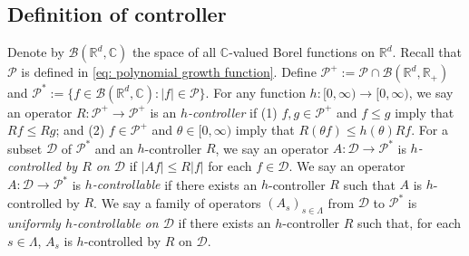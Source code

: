 \documentclass[12pt,a4paper]{amsart}
\theoremstyle{plain}
\theoremstyle{definition}
\numberwithin{equation}{section}
\begin{document}
\subsection{Definition of controller}
\label{sec: controller}
	Denote by $\mathcal B(\mathbb R^d, \mathbb C)$ the space of all $\mathbb C$-valued Borel functions on $\mathbb R^d$.
	Recall that $\mathcal P$ is defined in \eqref{eq: polynomial growth function}.
    Define $\mathcal P^+:= \mathcal P \cap \mathcal B(\mathbb R^d, \mathbb R_+)$ and $\mathcal P^*:= \{f\in \mathcal B(\mathbb R^d, \mathbb C): |f|\in \mathcal P\}$.
    For any function $h: [0,\infty) \to [0,\infty)$, we say an operator $R: \mathcal P^+ \to \mathcal P^+$ is an \emph{$h$-controller} if
(1) $f, g\in \mathcal P^+$ and $f\leq g$ imply that $Rf \leq Rg$; and (2) $f \in \mathcal P^+$ and $\theta \in [0,\infty)$ imply that $ R (\theta f)\leq h(\theta) Rf$.
       For a subset $\mathcal D$ of $\mathcal P^*$ and an $h$-controller $R$, we say an operator $A : \mathcal D \to \mathcal P^*$ is \emph{$h$-controlled by $R$ on $\mathcal D$} if $|Af| \leq R|f|$ for each $f\in \mathcal D$.
    We say an operator $A : \mathcal D \to \mathcal P^*$ is \emph{$h$-controllable} if there exists an $h$-controller $R$ such that $A$ is $h$-controlled by $R$.
     We say a family of operators $(A_s)_{s\in \Lambda}$ from $\mathcal D $ to $\mathcal P^*$ is \emph{uniformly $h$-controllable on $\mathcal D$} if there exists an $h$-controller $R$ such that, for each $s\in \Lambda$, $A_s$ is $h$-controlled by $R$ on $\mathcal D$.
\end{document}
